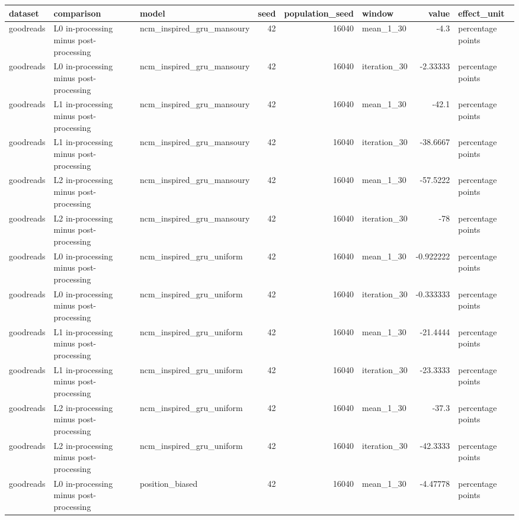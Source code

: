 \begin{table}[htbp!]
\centering
\small
\setlength{\tabcolsep}{3pt}
\renewcommand{\arraystretch}{1.1}
\begin{tabular}{lllrrlrl}
\hline
dataset & comparison & model & seed & population\_seed & window & value & effect\_unit \\
\hline
goodreads & L0 in-processing minus post-processing & ncm\_inspired\_gru\_mansoury & 42 & 16040 & mean\_1\_30 & -4.3 & percentage points \\
goodreads & L0 in-processing minus post-processing & ncm\_inspired\_gru\_mansoury & 42 & 16040 & iteration\_30 & -2.33333 & percentage points \\
goodreads & L1 in-processing minus post-processing & ncm\_inspired\_gru\_mansoury & 42 & 16040 & mean\_1\_30 & -42.1 & percentage points \\
goodreads & L1 in-processing minus post-processing & ncm\_inspired\_gru\_mansoury & 42 & 16040 & iteration\_30 & -38.6667 & percentage points \\
goodreads & L2 in-processing minus post-processing & ncm\_inspired\_gru\_mansoury & 42 & 16040 & mean\_1\_30 & -57.5222 & percentage points \\
goodreads & L2 in-processing minus post-processing & ncm\_inspired\_gru\_mansoury & 42 & 16040 & iteration\_30 & -78 & percentage points \\
goodreads & L0 in-processing minus post-processing & ncm\_inspired\_gru\_uniform & 42 & 16040 & mean\_1\_30 & -0.922222 & percentage points \\
goodreads & L0 in-processing minus post-processing & ncm\_inspired\_gru\_uniform & 42 & 16040 & iteration\_30 & -0.333333 & percentage points \\
goodreads & L1 in-processing minus post-processing & ncm\_inspired\_gru\_uniform & 42 & 16040 & mean\_1\_30 & -21.4444 & percentage points \\
goodreads & L1 in-processing minus post-processing & ncm\_inspired\_gru\_uniform & 42 & 16040 & iteration\_30 & -23.3333 & percentage points \\
goodreads & L2 in-processing minus post-processing & ncm\_inspired\_gru\_uniform & 42 & 16040 & mean\_1\_30 & -37.3 & percentage points \\
goodreads & L2 in-processing minus post-processing & ncm\_inspired\_gru\_uniform & 42 & 16040 & iteration\_30 & -42.3333 & percentage points \\
goodreads & L0 in-processing minus post-processing & position\_biased & 42 & 16040 & mean\_1\_30 & -4.47778 & percentage points \\

\end{tabular}
\end{table}
